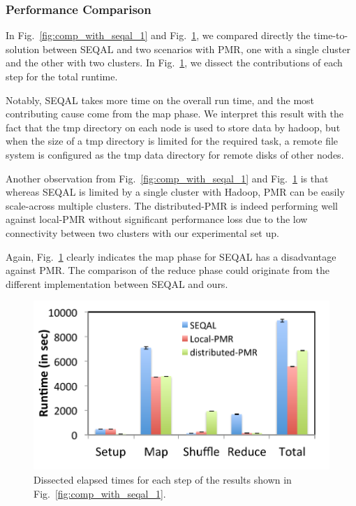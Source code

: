 \documentclass{sig-alternate}
\begin{document}
\subsubsection{Performance Comparison}
In Fig.~\ref{fig:comp_with_seqal_1} and Fig.~\ref{fig:comp_with_seqal_2}, we compared directly the time-to-solution between SEQAL and two scenarios with PMR, one with a single cluster and the other with two clusters.  In Fig.~\ref{fig:comp_with_seqal_2}, we dissect the contributions of each step for the total runtime.  

Notably, SEQAL takes more time on the overall run time, and the most contributing cause come from the map phase.  We interpret this result with the fact that the tmp directory on each node is used to store data by hadoop, but when the size of a tmp directory is limited for the required task, a remote file system is configured as  the tmp data directory for remote disks of other nodes.

Another observation from Fig.~\ref{fig:comp_with_seqal_1} and Fig.~\ref{fig:comp_with_seqal_2} is that whereas SEQAL is limited by a single cluster with Hadoop, PMR can be easily scale-across multiple clusters. The distributed-PMR is indeed performing well against local-PMR without significant performance loss due to the low connectivity between two clusters with our experimental set up.  

Again, Fig.~\ref{fig:comp_with_seqal_2} clearly indicates the map phase for SEQAL has a disadvantage against PMR.  The comparison of the reduce phase could originate from the different implementation between SEQAL and ours.

\begin{figure} 
 \centering
\includegraphics[scale=0.50]{figures/8GB_phasewisetimes.pdf}
\caption{\small  Dissected elapsed times for each step of the results shown in Fig.~\ref{fig:comp_with_seqal_1}.  }
  \label{fig:comp_with_seqal_2} 
\end{figure}
\end{document}
